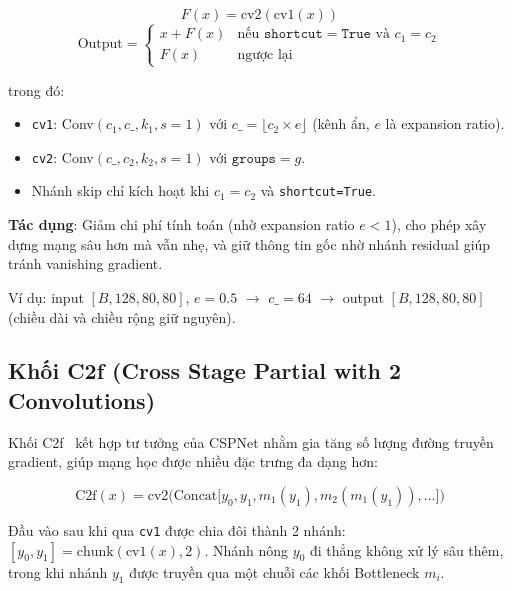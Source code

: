 \begin{equation}
    F(x) = \text{cv2}(\text{cv1}(x))
    \label{eq:bottleneck_Fx}
\end{equation}
\begin{equation}
    \text{Output} = \begin{cases}
        x + F(x) & \text{nếu } \texttt{shortcut} = \texttt{True} \text{ và } c_1 = c_2 \\
        F(x) & \text{ngược lại}
    \end{cases}
    \label{eq:bottleneck_output}
\end{equation}

\noindent trong đó:
\begin{itemize}
    \item \texttt{cv1}: Conv$(c_1, c\_, k_1, s=1)$ với $c\_ = \lfloor c_2 \times e \rfloor$ (kênh ẩn, $e$ là expansion ratio).
    \item \texttt{cv2}: Conv$(c\_, c_2, k_2, s=1)$ với $\texttt{groups}=g$.
    \item Nhánh skip chỉ kích hoạt khi $c_1 = c_2$ và \texttt{shortcut=True}.
\end{itemize}

\textbf{Tác dụng}: Giảm chi phí tính toán (nhờ expansion ratio $e < 1$), cho phép xây dựng mạng sâu hơn mà vẫn nhẹ, và giữ thông tin gốc nhờ nhánh residual giúp tránh vanishing gradient.

Ví dụ: input $[B, 128, 80, 80]$, $e=0.5$ $\to$ $c\_=64$ $\to$ output $[B, 128, 80, 80]$ (chiều dài và chiều rộng giữ nguyên).

\subsection{Khối C2f (Cross Stage Partial with 2 Convolutions)}
\label{subsec:c2f}

Khối C2f~\cite{cspnet} kết hợp tư tưởng của CSPNet nhằm gia tăng số lượng đường truyền gradient, giúp mạng học được nhiều đặc trưng đa dạng hơn:

\begin{equation}
    \text{C2f}(x) = \text{cv2}\Big(\text{Concat}\big[y_0, y_1, m_1(y_1), m_2(m_1(y_1)), \ldots\big]\Big)
\end{equation}

Đầu vào sau khi qua \texttt{cv1} được chia đôi thành 2 nhánh: $[y_0, y_1] = \text{chunk}(\text{cv1}(x), 2)$. Nhánh nông $y_0$ đi thẳng không xử lý sâu thêm, trong khi nhánh $y_1$ được truyền qua một chuỗi các khối Bottleneck $m_i$.

